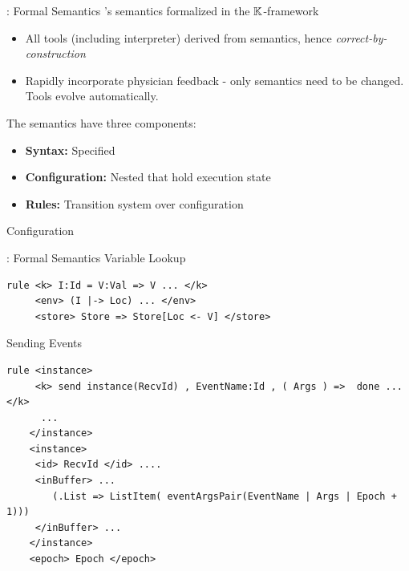 \documentclass{beamer}
\begin{document}
\begin{frame}[fragile]{\MediK{}: Formal Semantics}
  \MediK{}'s semantics formalized in the $\mathbb{K}{}$-framework
  \begin{itemize}
    \item All tools (including interpreter) derived from semantics,
      hence \emph{correct-by-construction}
    \item Rapidly incorporate physician feedback - only
      semantics need to be changed. Tools evolve automatically.
  \end{itemize}
  \pause
  The semantics have three components:
  \begin{itemize}
    \item \textbf{Syntax:} Specified
    \item \textbf{Configuration:} Nested  that hold execution state
    \item \textbf{Rules:} Transition system over configuration
  \end{itemize}
\end{frame}
\begin{frame}[fragile]{\MediK{} Configuration}

  
\end{frame}
\begin{frame}[fragile]{\MediK{}: Formal Semantics}
  Variable Lookup
  \begin{lstlisting}[language=k,style=ksty,basicstyle=\ttfamily\tiny]
rule <k> I:Id = V:Val => V ... </k>
     <env> (I |-> Loc) ... </env>
     <store> Store => Store[Loc <- V] </store>
  \end{lstlisting}
  \pause
  Sending Events
  \begin{lstlisting}[language=k,style=ksty,basicstyle=\ttfamily\tiny]
rule <instance>
     <k> send instance(RecvId) , EventName:Id , ( Args ) =>  done ... </k>
      ...
    </instance>
    <instance>
     <id> RecvId </id> ....
     <inBuffer> ...
        (.List => ListItem( eventArgsPair(EventName | Args | Epoch + 1)))
     </inBuffer> ...
    </instance>
    <epoch> Epoch </epoch>
  \end{lstlisting}
\end{frame}
\end{document}
